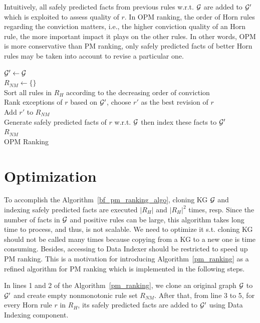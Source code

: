 Intuitively, all safely predicted facts from previous rules w.r.t. $\mathcal{G}$ are added to $\mathcal{G}'$ which is exploited to assess quality of $r$. In OPM ranking, the order of Horn rules regarding the conviction matters, i.e., the higher conviction quality of an Horn rule, the more important impact it plays on the other rules. In other words, OPM is more conservative than PM ranking, only safely predicted facts of better Horn rules may be taken into account to revise a particular one.

\IncMargin{1.5em}
\begin{algorithm}[H]
\DontPrintSemicolon
\SetAlgoLined
{}
\BlankLine
$\mathcal{G}' \leftarrow \mathcal{G}$\\
$R_{NM} \leftarrow \{\}$\\
Sort all rules in $R_H$ according to the decreasing order of conviction\\
\BlankLine
{} {
	Rank exceptions of $r$ based on $\mathcal{G}'$, choose $r'$ as the best revision of $r$\\
	Add $r'$ to $R_{NM}$\\
	Generate safely predicted facts of $r$ w.r.t. $\mathcal{G}$ then index these facts to $\mathcal{G}'$\\
}
\Return $R_{NM}$\\
\caption{OPM Ranking}
\label{opm_ranking_algo}
\end{algorithm}
\DecMargin{1.5em}

\section{Optimization}

To accomplish the Algorithm~\ref{bf_pm_ranking_algo}, cloning KG $\mathcal{G}$ and indexing safely predicted facts are executed $|R_H|$ and $|R_H|^2$ times, resp. Since the number of facts in $\mathcal{G}$ and positive rules can be large, this algorithm takes long time to process, and thus, is not scalable. We need to optimize it s.t. cloning KG should not be called many times because copying from a KG to a new one is time consuming. Besides, accessing to Data Indexer should be restricted to speed up PM ranking. This is a motivation for introducing Algorithm~\ref{pm_ranking} as a refined algorithm for PM ranking which is implemented in the following steps.

In lines 1 and 2 of the Algorithm~\ref{pm_ranking}, we clone an original graph $\mathcal{G}$ to $\mathcal{G}'$ and create empty nonmonotonic rule set $R_{NM}$. After that, from line 3 to 5, for every Horn rule $r$ in $R_H$, its safely predicted facts are added to $\mathcal{G}'$ using Data Indexing component. 

